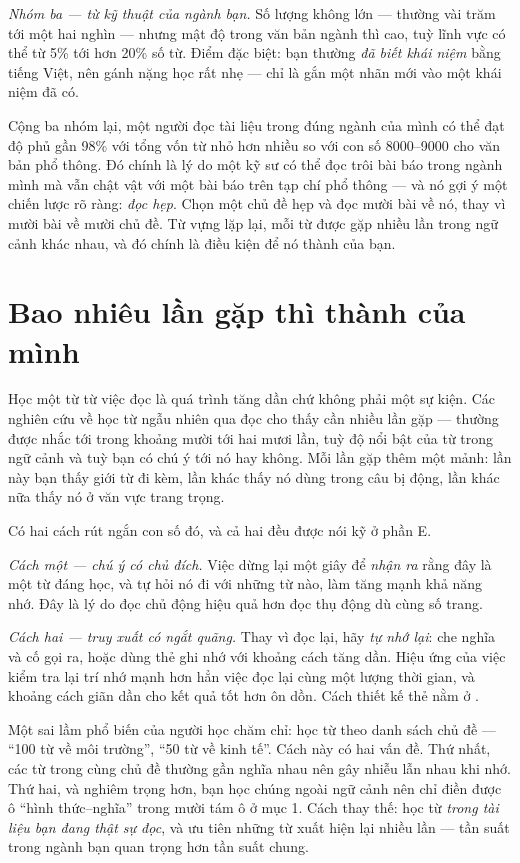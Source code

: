 \documentclass[../../english.tex]{subfiles}
\begin{document}
\emph{Nhóm ba --- từ kỹ thuật của ngành bạn.} Số lượng không lớn --- thường vài trăm tới một hai nghìn --- nhưng mật độ trong văn bản ngành thì cao, tuỳ lĩnh vực có thể từ 5\% tới hơn 20\% số từ\cite{chungnation2003}. Điểm đặc biệt: bạn thường \emph{đã biết khái niệm} bằng tiếng Việt, nên gánh nặng học rất nhẹ --- chỉ là gắn một nhãn mới vào một khái niệm đã có.

Cộng ba nhóm lại, một người đọc tài liệu trong đúng ngành của mình có thể đạt độ phủ gần 98\% với tổng vốn từ nhỏ hơn nhiều so với con số 8000--9000 cho văn bản phổ thông. Đó chính là lý do một kỹ sư có thể đọc trôi bài báo trong ngành mình mà vẫn chật vật với một bài báo trên tạp chí phổ thông --- và nó gợi ý một chiến lược rõ ràng: \emph{đọc hẹp}. Chọn một chủ đề hẹp và đọc mười bài về nó, thay vì mười bài về mười chủ đề. Từ vựng lặp lại, mỗi từ được gặp nhiều lần trong ngữ cảnh khác nhau, và đó chính là điều kiện để nó thành của bạn.

\section{Bao nhiêu lần gặp thì thành của mình}

Học một từ từ việc đọc là quá trình tăng dần chứ không phải một sự kiện. Các nghiên cứu về học từ ngẫu nhiên qua đọc cho thấy cần nhiều lần gặp --- thường được nhắc tới trong khoảng mười tới hai mươi lần, tuỳ độ nổi bật của từ trong ngữ cảnh và tuỳ bạn có chú ý tới nó hay không\cite{webbnation2017}. Mỗi lần gặp thêm một mảnh: lần này bạn thấy giới từ đi kèm, lần khác thấy nó dùng trong câu bị động, lần khác nữa thấy nó ở văn vực trang trọng.

Có hai cách rút ngắn con số đó, và cả hai đều được nói kỹ ở phần E.

\emph{Cách một --- chú ý có chủ đích.} Việc dừng lại một giây để \emph{nhận ra} rằng đây là một từ đáng học, và tự hỏi nó đi với những từ nào, làm tăng mạnh khả năng nhớ. Đây là lý do đọc chủ động hiệu quả hơn đọc thụ động dù cùng số trang.

\emph{Cách hai --- truy xuất có ngắt quãng.} Thay vì đọc lại, hãy \emph{tự nhớ lại}: che nghĩa và cố gọi ra, hoặc dùng thẻ ghi nhớ với khoảng cách tăng dần. Hiệu ứng của việc kiểm tra lại trí nhớ mạnh hơn hẳn việc đọc lại cùng một lượng thời gian\cite{roediger2006}, và khoảng cách giãn dần cho kết quả tốt hơn ôn dồn\cite{cepeda2006}. Cách thiết kế thẻ nằm ở .

\begin{cambay}
Một sai lầm phổ biến của người học chăm chỉ: học từ theo danh sách chủ đề --- ``100 từ về môi trường'', ``50 từ về kinh tế''. Cách này có hai vấn đề. Thứ nhất, các từ trong cùng chủ đề thường gần nghĩa nhau nên gây nhiễu lẫn nhau khi nhớ. Thứ hai, và nghiêm trọng hơn, bạn học chúng ngoài ngữ cảnh nên chỉ điền được ô ``hình thức--nghĩa'' trong mười tám ô ở mục 1. Cách thay thế: học từ \emph{trong tài liệu bạn đang thật sự đọc}, và ưu tiên những từ xuất hiện lại nhiều lần --- tần suất trong ngành bạn quan trọng hơn tần suất chung.
\end{cambay}
\end{document}

